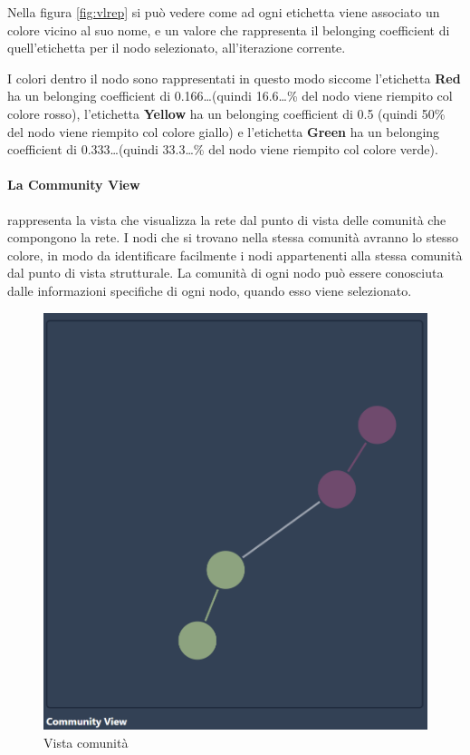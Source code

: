 \documentclass[a4paper,12pt]{report}
\begin{document}
			Nella figura \ref{fig:vlrep} si può vedere come ad ogni etichetta viene associato un colore vicino al suo nome, e un valore che rappresenta il belonging coefficient di quell'etichetta per il nodo selezionato, all'iterazione corrente. 

			I colori dentro il nodo sono rappresentati in questo modo siccome l'etichetta \textbf{Red} ha un belonging coefficient di 0.166\dots (quindi 16.6\dots\% del nodo viene riempito col colore rosso), l'etichetta \textbf{Yellow} ha un belonging coefficient di 0.5 (quindi 50\% del nodo viene riempito col colore giallo) e l'etichetta \textbf{Green} ha un belonging coefficient di 0.333\dots (quindi 33.3\dots\% del nodo viene riempito col colore verde).

\pagebreak	

		\paragraph*{La Community View} rappresenta la vista che visualizza la rete dal punto di vista delle comunità che compongono la rete. I nodi che si trovano nella stessa comunità avranno lo stesso colore, in modo da identificare facilmente i nodi appartenenti alla stessa comunità dal punto di vista strutturale. La comunità di ogni nodo può essere conosciuta dalle informazioni specifiche di ogni nodo, quando esso viene selezionato. 

			\begin{center}
			\begin{figure}[H]
			\centering
			\includegraphics[width=0.9\linewidth,keepaspectratio]{comview}
			\caption{Vista comunità}
			\end{figure}
			\end{center}			
\end{document}
